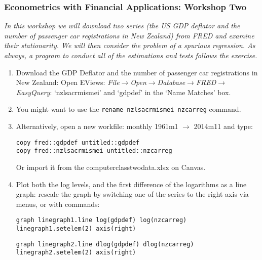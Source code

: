 \documentclass[a4paper,10pt]{article}
\begin{document}
\small
\subsubsection*{Econometrics with Financial Applications: Workshop Two}
\textit{In this workshop we will download two series (the US GDP deflator and the number of passenger car registrations in New Zealand) from FRED and examine their stationarity. We will then consider the problem of a spurious regression. As always, a program to conduct all of the estimations and tests follows the exercise.}
\begin{enumerate}
\item Download the GDP Deflator and the number of passenger car registrations in New Zealand: Open EViews: \emph{File}$\rightarrow$\emph{Open}$\rightarrow$\emph{Database}$\rightarrow$\emph{FRED}$\rightarrow$\emph{EasyQuery}: `nzlsacrmismei' and `gdpdef' in the `Name Matches' box. 
\item You might want to use the \texttt{rename nzlsacrmismei nzcarreg} command.
\item Alternatively, open a new workfile: monthly 1961m1 $\rightarrow$ 2014m11 and type:
\begin{center}
\texttt{copy fred::gdpdef untitled::gdpdef\\
copy fred::nzlsacrmismei untitled::nzcarreg}
\end{center}
Or import it from the computerclasstwodata.xlsx on Canvas.
\item Plot both the log levels, and the first difference of the logarithms as a line graph: rescale the graph by switching one of the series to the right axis via menus, or with commands:

\begin{center}
\texttt{graph linegraph1.line log(gdpdef) log(nzcarreg)\\
linegraph1.setelem(2) axis(right)}

\texttt{graph linegraph2.line dlog(gdpdef) dlog(nzcarreg)\\
linegraph2.setelem(2) axis(right)}
\end{center}


\end{enumerate}
\end{document}
